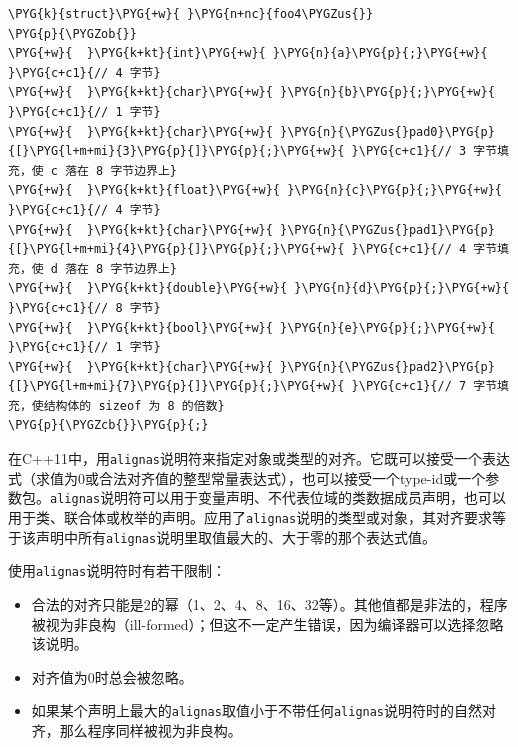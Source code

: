 \begin{codeblockbg}
\begin{Verbatim}[commandchars=\\\{\},breaklines=true,breakanywhere=true,fontsize=\codefont,xleftmargin=17bp]
\PYG{k}{struct}\PYG{+w}{ }\PYG{n+nc}{foo4\PYGZus{}}
\PYG{p}{\PYGZob{}}
\PYG{+w}{  }\PYG{k+kt}{int}\PYG{+w}{ }\PYG{n}{a}\PYG{p}{;}\PYG{+w}{         }\PYG{c+c1}{// 4 字节}
\PYG{+w}{  }\PYG{k+kt}{char}\PYG{+w}{ }\PYG{n}{b}\PYG{p}{;}\PYG{+w}{        }\PYG{c+c1}{// 1 字节}
\PYG{+w}{  }\PYG{k+kt}{char}\PYG{+w}{ }\PYG{n}{\PYGZus{}pad0}\PYG{p}{[}\PYG{l+m+mi}{3}\PYG{p}{]}\PYG{p}{;}\PYG{+w}{ }\PYG{c+c1}{// 3 字节填充，使 c 落在 8 字节边界上}
\PYG{+w}{  }\PYG{k+kt}{float}\PYG{+w}{ }\PYG{n}{c}\PYG{p}{;}\PYG{+w}{       }\PYG{c+c1}{// 4 字节}
\PYG{+w}{  }\PYG{k+kt}{char}\PYG{+w}{ }\PYG{n}{\PYGZus{}pad1}\PYG{p}{[}\PYG{l+m+mi}{4}\PYG{p}{]}\PYG{p}{;}\PYG{+w}{ }\PYG{c+c1}{// 4 字节填充，使 d 落在 8 字节边界上}
\PYG{+w}{  }\PYG{k+kt}{double}\PYG{+w}{ }\PYG{n}{d}\PYG{p}{;}\PYG{+w}{      }\PYG{c+c1}{// 8 字节}
\PYG{+w}{  }\PYG{k+kt}{bool}\PYG{+w}{ }\PYG{n}{e}\PYG{p}{;}\PYG{+w}{        }\PYG{c+c1}{// 1 字节}
\PYG{+w}{  }\PYG{k+kt}{char}\PYG{+w}{ }\PYG{n}{\PYGZus{}pad2}\PYG{p}{[}\PYG{l+m+mi}{7}\PYG{p}{]}\PYG{p}{;}\PYG{+w}{ }\PYG{c+c1}{// 7 字节填充，使结构体的 sizeof 为 8 的倍数}
\PYG{p}{\PYGZcb{}}\PYG{p}{;}
\end{Verbatim}
\end{codeblockbg}



在C++11中，用\texttt{alignas}说明符来指定对象或类型的对齐。它既可以接受一个表达式（求值为0或合法对齐值的整型常量表达式），也可以接受一个type-id或一个参数包。\texttt{alignas}说明符可以用于变量声明、不代表位域的类数据成员声明，也可以用于类、联合体或枚举的声明。应用了\texttt{alignas}说明的类型或对象，其对齐要求等于该声明中所有\texttt{alignas}说明里取值最大的、大于零的那个表达式值。



使用\texttt{alignas}说明符时有若干限制：



\begin{itemize}
\item 合法的对齐只能是2的幂（1、2、4、8、16、32等）。其他值都是非法的，程序被视为非良构（ill-formed）；但这不一定产生错误，因为编译器可以选择忽略该说明。



\item 对齐值为0时总会被忽略。



\item 如果某个声明上最大的\texttt{alignas}取值小于不带任何\texttt{alignas}说明符时的自然对齐，那么程序同样被视为非良构。

\end{itemize}


